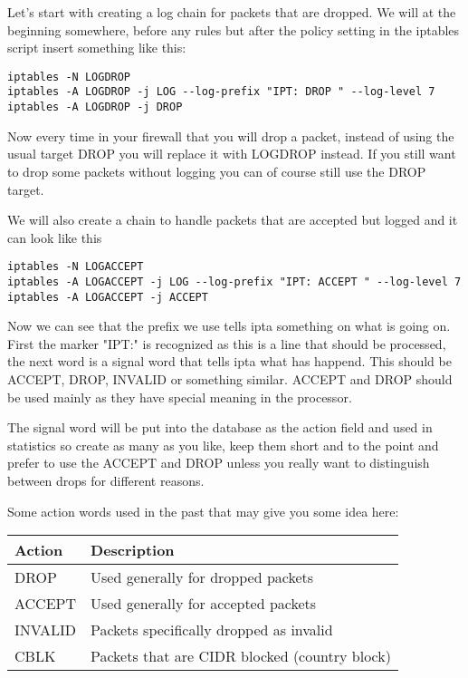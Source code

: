 \documentclass[english,twoside,openright,a4paper,12pt]{article}
\begin{document}
Let's start with creating a log chain for packets that are dropped. We
will at the beginning somewhere, before any rules but after the policy
setting in the iptables script insert something like this:

\small
\begin{verbatim}
iptables -N LOGDROP
iptables -A LOGDROP -j LOG --log-prefix "IPT: DROP " --log-level 7
iptables -A LOGDROP -j DROP
\end{verbatim}
\normalsize

Now every time in your firewall that you will drop a packet, instead
of using the usual target DROP you will replace it with LOGDROP
instead. If you still want to drop some packets without logging you
can of course still use the DROP target.

We will also create a chain to handle packets that are accepted but
logged and it can look like this

\small
\begin{verbatim}
iptables -N LOGACCEPT
iptables -A LOGACCEPT -j LOG --log-prefix "IPT: ACCEPT " --log-level 7
iptables -A LOGACCEPT -j ACCEPT
\end{verbatim}
\normalsize

Now we can see that the prefix we use tells ipta something on what is
going on. First the marker "IPT:" is recognized as this is a line
that should be processed, the next word is a signal word that tells
ipta what has happend. This should be ACCEPT, DROP, INVALID or
something similar. ACCEPT and DROP should be used mainly as they have
special meaning in the processor.

The signal word will be put into the database as the action field and
used in statistics so create as many as you like, keep them short and
to the point and prefer to use the ACCEPT and DROP unless you really
want to distinguish between drops for different reasons.

Some action words used in the past that may give you some idea here:

\begin{table}[H]
\begin{tabular}{ll}
	\textbf{Action} & \textbf{Description  }                        \\ \hline
	DROP            & Used generally for dropped packets            \\
	ACCEPT          & Used generally for accepted packets           \\
	INVALID         & Packets specifically dropped as invalid       \\
	CBLK            & Packets that are CIDR blocked (country block)
\end{tabular}
\end{table}
\end{document}
